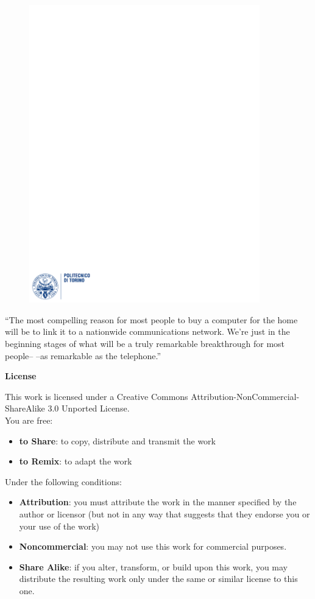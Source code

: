 \documentclass[12pt]{article}
\begin{document}
\begin{figure}
  \centering
  \includegraphics[width=10cm]{images/polito.pdf}
\end{figure}

\maketitle

\newpage
\tableofcontents
\bigskip
\bigskip
``The most compelling reason for most people to buy a computer for the home will be to link it to a nationwide communications network. We’re just in the beginning stages of what will be a truly remarkable breakthrough for most people– –as remarkable as the telephone.''\\
\newpage

{\noindent \Large \textbf{License}\bigskip}

This work is licensed under a Creative Commons Attribution-NonCommercial-ShareAlike 3.0 Unported License.\\
You are free:
\begin{itemize}
  \item \textbf{to Share}: to copy, distribute and transmit the work
  \item \textbf{to Remix}: to adapt the work
\end{itemize}
Under the following conditions:
\begin{itemize}
  \item \textbf{Attribution}: you must attribute the work in the manner specified by the author or licensor (but not in any way that suggests that they endorse you or your use of the work)
  \item \textbf{Noncommercial}: you may not use this work for commercial purposes.
  \item \textbf{Share Alike}: if you alter, transform, or build upon this work, you may distribute the resulting work only under the same or similar license to this one.
\end{itemize}
\end{document}
